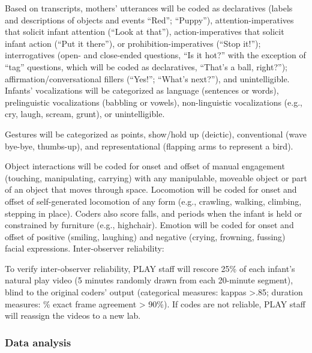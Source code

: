 \documentclass[english,man]{apa6}
\theoremstyle{definition}
\theoremstyle{definition}
\theoremstyle{definition}
\theoremstyle{remark}
\begin{document}
Based on transcripts, mothers' utterances will be coded as declaratives
(labels and descriptions of objects and events \enquote{Red};
\enquote{Puppy}), attention-imperatives that solicit infant attention
(\enquote{Look at that}), action-imperatives that solicit infant action
(\enquote{Put it there}), or prohibition-imperatives (\enquote{Stop
it!}); interrogatives (open- and close-ended questions, \enquote{Is it
hot?} with the exception of \enquote{tag} questions, which will be coded
as declaratives, \enquote{That's a ball, right?});
affirmation/conversational fillers (\enquote{Yes!}; \enquote{What's
next?}), and unintelligible. Infants' vocalizations will be categorized
as language (sentences or words), prelinguistic vocalizations (babbling
or vowels), non-linguistic vocalizations (e.g., cry, laugh, scream,
grunt), or unintelligible.

Gestures will be categorized as points, show/hold up (deictic),
conventional (wave bye-bye, thumbs-up), and representational (flapping
arms to represent a bird).

Object interactions will be coded for onset and offset of manual
engagement (touching, manipulating, carrying) with any manipulable,
moveable object or part of an object that moves through space.
Locomotion will be coded for onset and offset of self-generated
locomotion of any form (e.g., crawling, walking, climbing, stepping in
place). Coders also score falls, and periods when the infant is held or
constrained by furniture (e.g., highchair). Emotion will be coded for
onset and offset of positive (smiling, laughing) and negative (crying,
frowning, fussing) facial expressions. Inter-observer reliability:

To verify inter-observer reliability, PLAY staff will rescore 25\% of
each infant's natural play video (5 minutes randomly drawn from each
20-minute segment), blind to the original coders' output (categorical
measures: kappas \textgreater{}.85; duration measures: \% exact frame
agreement \textgreater{} 90\%). If codes are not reliable, PLAY staff
will reassign the videos to a new lab.

\subsubsection{Data analysis}\label{data-analysis-1}
\end{document}
